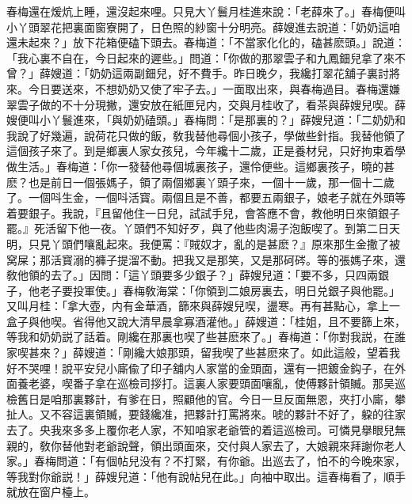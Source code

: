 春梅還在煖炕上睡，還沒起來哩。只見大丫鬟月桂進來說：「老薛來了。」春梅便叫小丫頭翠花把裏面窗寮開了，日色照的紗窗十分明亮。薛嫂進去說道：「奶奶這咱還未起來？」放下花箱便磕下頭去。春梅道：「不當家化化的，磕甚麽頭。」說道：「我心裏不自在，今日起來的遲些。」問道：「你做的那翠雲子和九鳳鈿兒拿了來不曾？」薛嫂道：「奶奶這兩副鈿兒，好不費手。昨日晚夕，我纔打翠花舖子裏討將來。今日要送來，不想奶奶又使了牢子去。」一面取出來，與春梅過目。春梅還嫌翠雲子做的不十分現撇，還安放在紙匣兒内，交與月桂收了，看茶與薛嫂兒喫。薛嫂便叫小丫鬟進來，「與奶奶磕頭。」春梅問：「是那裏的？」薛嫂兒道：「二奶奶和我說了好幾遍，說荷花只做的飯，敎我替他尋個小孩子，學做些針指。我替他領了這個孩子來了。到是鄉裏人家女孩兒，今年纔十二歲，正是養材兒，只好拘束着學做生活。」春梅道：「你一發替他尋個城裏孩子，還伶便些。這鄉裏孩子，曉的甚麽？也是前日一個張媽子，領了兩個鄉裏丫頭子來，一個十一歲，那一個十二歲了。一個呌生金，一個呌活寳。兩個且是不善，都要五兩銀子，娘老子就在外頭等着要銀子。我說，『且留他住一日兒，試試手兒，會答應不會，教他明日來領銀子罷。』死活留下他一夜。丫頭們不知好歹，與了他些肉湯子泡飯喫了。到第二日天明，只見丫頭們嚷亂起來。我便罵：『賊奴才，亂的是甚麽？』原來那生金撒了被窝屎；那活寳溺的褲子提溜不動。把我又是那笑，又是那砢硶。等的張媽子來，還敎他領的去了。」因問：「這丫頭要多少銀子？」薛嫂兒道：「要不多，只四兩銀子，他老子要投軍使。」春梅敎海棠：「你領到二娘房裏去，明日兑銀子與他罷。」又叫月桂：「拿大壺，内有金華酒，篩來與薛嫂兒喫，盪寒。再有甚點心，拿上一盒子與他喫。省得他又說大清早晨拿寡酒灌他。」薛嫂道：「桂姐，且不要篩上來，等我和奶奶説了話着。剛纔在那裏也喫了些甚麽來了。」春梅道：「你對我説，在誰家喫甚來？」薛嫂道：「剛纔大娘那頭，留我喫了些甚麽來了。如此這般，望着我好不哭哩！說平安兒小廝偸了印子舖内人家當的金頭面，還有一把鍍金鈎子，在外面養老婆，喫番子拿在巡檢司拶打。這裏人家要頭面嚷亂，使傅夥計領贓。那吴巡檢舊日是咱那裏夥計，有爹在日，照顧他的官。今日一旦反面無恩，夾打小廝，攀扯人。又不容這裏領贓，要錢纔准，把夥計打罵將來。唬的夥計不好了，躱的往家去了。央我來多多上覆你老人家，不知咱家老爺管的着這巡檢司。可憐見擧眼兒無親的，敎你替他對老爺說聲，領出頭面來，交付與人家去了，大娘親來拜謝你老人家。」春梅問道：「有個帖兒没有？不打緊，有你爺。出巡去了，怕不的今晚來家，等我對你爺説！」薛嫂兒道：「他有說帖兒在此。」向袖中取出。這春梅看了，順手就放在窗户檯上。

